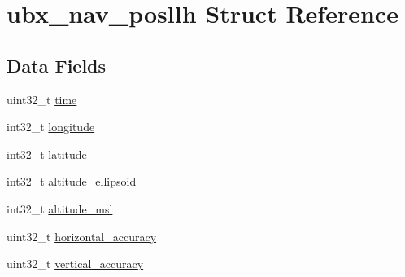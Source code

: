 \hypertarget{structubx__nav__posllh}{\section{ubx\+\_\+nav\+\_\+posllh Struct Reference}
\label{structubx__nav__posllh}
}
\subsection*{Data Fields}
\begin{DoxyCompactItemize}
\item 
uint32\+\_\+t \hyperlink{structubx__nav__posllh_abd088973260a28540a363b43313752de}{time}
\item 
int32\+\_\+t \hyperlink{structubx__nav__posllh_a1ec90e9cd76ecb065afcbb475c20b869}{longitude}
\item 
int32\+\_\+t \hyperlink{structubx__nav__posllh_a61002a3c8345cf72a1dcaa7ee986e99d}{latitude}
\item 
int32\+\_\+t \hyperlink{structubx__nav__posllh_a6fb9625119ba9089ca95b991d3c172dd}{altitude\+\_\+ellipsoid}
\item 
int32\+\_\+t \hyperlink{structubx__nav__posllh_a1f5c943cfb736b62c872caf5e4ef1bfe}{altitude\+\_\+msl}
\item 
uint32\+\_\+t \hyperlink{structubx__nav__posllh_a85cb433495a6f5d814c3ca36136668f3}{horizontal\+\_\+accuracy}
\item 
uint32\+\_\+t \hyperlink{structubx__nav__posllh_ad3a1770b51e7db0d2d0153423b029965}{vertical\+\_\+accuracy}
\end{DoxyCompactItemize}


